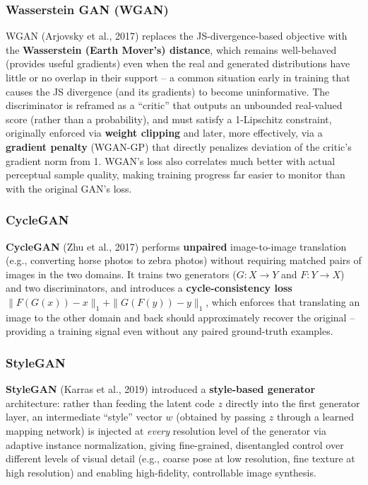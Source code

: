 \documentclass[12pt,a4paper]{article}
\begin{document}
\subsubsection{Wasserstein GAN (WGAN)}

\begin{keyidea}
WGAN (Arjovsky et al., 2017) replaces the JS-divergence-based objective with the \textbf{Wasserstein (Earth Mover's) distance}, which remains well-behaved (provides useful gradients) even when the real and generated distributions have little or no overlap in their support -- a common situation early in training that causes the JS divergence (and its gradients) to become uninformative. The discriminator is reframed as a ``critic'' that outputs an unbounded real-valued score (rather than a probability), and must satisfy a 1-Lipschitz constraint, originally enforced via \textbf{weight clipping} and later, more effectively, via a \textbf{gradient penalty} (WGAN-GP) that directly penalizes deviation of the critic's gradient norm from 1. WGAN's loss also correlates much better with actual perceptual sample quality, making training progress far easier to monitor than with the original GAN's loss.
\end{keyidea}

\subsubsection{CycleGAN}

\textbf{CycleGAN} (Zhu et al., 2017) performs \textbf{unpaired} image-to-image translation (e.g., converting horse photos to zebra photos) without requiring matched pairs of images in the two domains. It trains two generators ($G: X\to Y$ and $F: Y \to X$) and two discriminators, and introduces a \textbf{cycle-consistency loss} $\|F(G(x)) - x\|_1 + \|G(F(y)) - y\|_1$, which enforces that translating an image to the other domain and back should approximately recover the original -- providing a training signal even without any paired ground-truth examples.

\subsubsection{StyleGAN}

\textbf{StyleGAN} (Karras et al., 2019) introduced a \textbf{style-based generator} architecture: rather than feeding the latent code $z$ directly into the first generator layer, an intermediate ``style'' vector $w$ (obtained by passing $z$ through a learned mapping network) is injected at \emph{every} resolution level of the generator via adaptive instance normalization, giving fine-grained, disentangled control over different levels of visual detail (e.g., coarse pose at low resolution, fine texture at high resolution) and enabling high-fidelity, controllable image synthesis.
\end{document}
